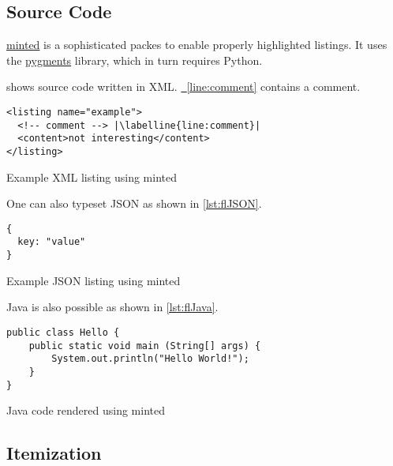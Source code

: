 \documentclass[conference,a4paper]{IEEEtran}[2015/08/26]
\newcommand{\labelline}[1]{\label[line]{#1}\hypertarget{#1}{}}
\newcommand{\refline}[1]{\hyperlink{#1}{\FancyVerbLineautorefname~\ref*{#1}}}
\begin{document}
\subsection{Source Code}

\href{https://github.com/gpoore/minted}{minted} is a sophisticated packes to enable properly highlighted listings.
It uses the \href{http://pygments.org/}{pygments} library, which in turn requires Python.

\begin{ltgexample}
 shows source code written in XML.
\refline{line:comment} contains a comment.

\begin{listing}[htbp]
    \begin{verbatim}
<listing name="example">
  <!-- comment --> |\labelline{line:comment}|
  <content>not interesting</content>
</listing>
\end{verbatim}
  \caption{Example XML listing using minted}
  \label{lst:XML}
\end{listing}
\end{ltgexample}

One can also typeset JSON as shown in \cref{lst:flJSON}.

\begin{ltgexample}
\begin{listing}[htbp]
    \begin{verbatim}
{
  key: "value"
}
\end{verbatim}
  \caption{Example JSON listing using minted}
  \label{lst:flJSON}
\end{listing}
\end{ltgexample}

Java is also possible as shown in \cref{lst:flJava}.

\begin{ltgexample}
\begin{listing}[htbp]
    \begin{verbatim}
public class Hello {
    public static void main (String[] args) {
        System.out.println("Hello World!");
    }
}
\end{verbatim}
  \caption{Java code rendered using minted}
  \label{lst:java}
\end{listing}
\end{ltgexample}

\subsection{Itemization}
\end{document}
